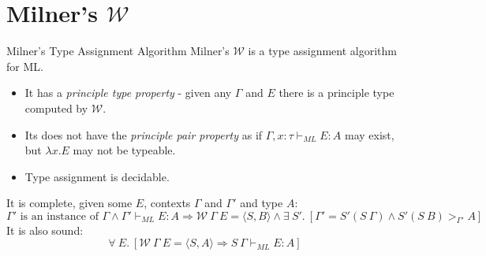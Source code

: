 \section{Milner's $\mathcal{W}$}
\begin{definitionbox}{Milner's Type Assignment Algorithm}
	Milner's $\mathcal{W}$ is a type assignment algorithm for ML.
	\begin{itemize}
		\item It has a \textit{principle type property} - given any $\Gamma$ and $E$ there is a principle type computed by $\mathcal{W}$.
		\item Its does not have the \textit{principle pair property} as if $\Gamma, x:\tau \vdash_{ML} E : A$ may exist, but $\lambda x. E$ may not be typeable.
		\item Type assignment is decidable.
	\end{itemize}
	It is complete, given some $E$, contexts $\Gamma$ and $\Gamma'$ and type $A$:
	\[\Gamma' \text{ is an instance of } \Gamma \land \Gamma' \vdash_{ML} E : A \Rightarrow \mathcal{W} \ \Gamma \ E = \langle S, B \rangle \land \exists \ S' . \ [\Gamma' = S' (S \ \Gamma) \land S' (S \ B) >_{\Gamma'} A]\]
	It is also sound:
	\[\forall \ E . \ [\mathcal{W} \ \Gamma \ E = \langle S, A \rangle \Rightarrow S \ \Gamma \vdash_{ML} E : A]\]
\end{definitionbox}

